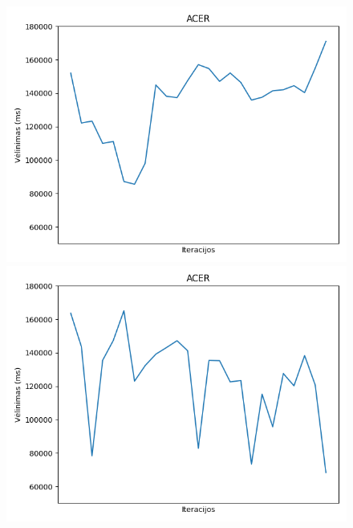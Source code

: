 \documentclass{VUMIFPSbakalaurinis}
\begin{document}
\begin{figure}[H]
    \centering
    \begin{minipage}[b]{0.4\textwidth}
        \includegraphics[width=\textwidth]{img/acer_50_2.png}
    \end{minipage}
    \hspace{1mm}
    \begin{minipage}[b]{0.4\textwidth}
        \includegraphics[width=\textwidth]{img/acer_100_2.png}
    \end{minipage}
    \hspace{1mm}
    \begin{minipage}[b]{0.4\textwidth}

\end{minipage}
\end{figure}
\end{document}
